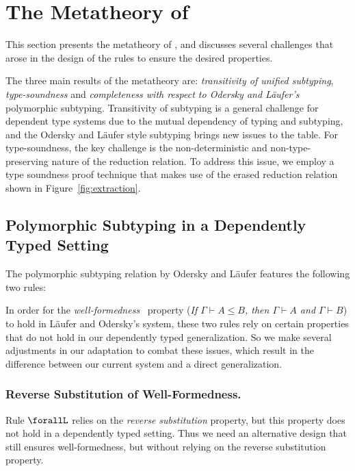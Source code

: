 \section{The Metatheory of \name}
\label{sec:metatheory}

This section presents the metatheory of \name, and discusses several challenges
that arose in the design of the rules to ensure the desired properties.

The three main results of the metatheory are:
\emph{transitivity of unified subtyping}, \emph{type-soundness} and
\emph{completeness with respect to Odersky and L\"aufer's} polymorphic
subtyping. Transitivity of subtyping is a general challenge for dependent type systems due
to the mutual dependency of typing and subtyping, and the Odersky and L\"aufer style
subtyping brings new issues to the table. For type-soundness, the key challenge
is the non-deterministic and non-type-preserving nature of the reduction relation.
To address this issue, we employ a type soundness proof technique
that makes use of the erased reduction relation shown in Figure~\ref{fig:extraction}.

\subsection{Polymorphic Subtyping in a Dependently Typed Setting}
\label{sec:adaptation}

The polymorphic subtyping relation by Odersky and L\"aufer features the following two rules:
In order for the \emph{well-formedness}~\cite{dunfield2013lemmas} property
(\emph{If $\Gamma \vdash A \le B$, then $\Gamma \vdash A$ and $\Gamma \vdash B$})
to hold in L\"aufer and Odersky's system, these two rules rely on certain properties
that do not hold in our dependently typed generalization. So we make several adjustments
in our adaptation to combat these issues, which result in the difference between
our current system and a direct generalization.

\subsubsection{Reverse Substitution of Well-Formedness.}
Rule $\forallL$ relies on the \emph{reverse substitution} property, but this property
does not hold in a dependently typed setting. Thus we need an alternative design that
still ensures well-formedness, but without relying on the reverse substitution property.

